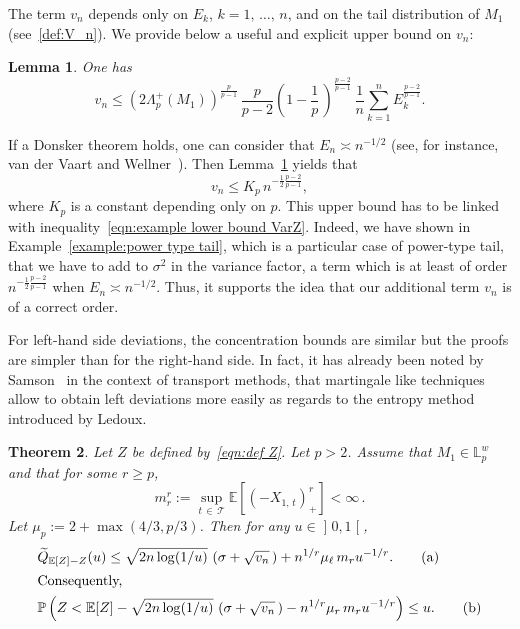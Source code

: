 \documentclass[10pt]{amsart}
\newtheorem{theo}{Theorem}[section]
\newtheorem{lemm}[theo]{Lemma}\newtheorem{prop}[theo]{Proposition}\newtheorem{coro}[theo]{Corollary}\newtheorem{conj}[theo]{Conjecture}
\theoremstyle{definition}\newtheorem{defi}[theo]{Definition}\newtheorem{rema}[theo]{Remark}\newtheorem{exam}[theo]{Example}\newtheorem{exem}[theo]{Example}\newtheorem{nota}[theo]{Notation}
\newcommand{\bE}{\mathbb{E}}
\newcommand{\bL}{\mathbb{L}}
\newcommand{\bP}{\mathbb{P}}
\newcommand{\cT}{\mathcal{T}}
\newcommand{\intervalleoo}[2]{\mathopen{]} #1\mathclose{}\mathpunct{},#2\mathclose{[}}
\let\oldtilde\tilde
\renewcommand*{\tilde}[1]{\mathchoice{\widetilde{#1}}{\widetilde{#1}}{\oldtilde{#1}}{\oldtilde{#1}}}
\begin{document}
The term $v_n$ depends only on $E_k$, $k=1,\,\ldots,\,n$, and on the tail distribution of $M_1$ (see~\eqref{def:V_n}). We provide below a useful and explicit upper bound on $v_n$:
\begin{lemm}\label{lem:upper bound Vn power type tail}
One has
\[
v_n\leq \left(2\Lambda_p^+(M_1)\right)^{\frac{p}{p-1}}\,\frac{p}{p-2}\left(1-\frac 1p\,\right)^{\frac{p-2}{p-1}}\,\frac 1n \sum_{k=1}^n E_k^{\frac{p-2}{p-1}}.
\]
\end{lemm}

If a Donsker theorem holds, one can consider that $E_n\asymp n^{-1/2}$ (see, for instance, van der Vaart and Wellner~\cite{vdVW96}). Then Lemma~\ref{lem:upper bound Vn power type tail} yields that
\begin{equation}\label{eqn:upper bound equiv Vn power type tail}
v_n\leq K_p\,n^{-\frac 12\frac{p-2}{p-1}},
\end{equation}
where $K_p$ is a constant depending only on $p$. This upper bound has to be linked with inequality~\eqref{eqn:example lower bound VarZ}. Indeed, we have shown in Example~\ref{example:power type tail}, which is a particular case of power-type tail, that we have to add to $\sigma^2$ in the variance factor, a term which is at least of order $n^{-\frac 12\frac{p-2}{p-1}}$ when $E_n\asymp n^{-1/2}$. Thus, it supports the idea that our additional term $v_n$ is of a correct order.

For left-hand side deviations, the concentration bounds are similar but the proofs are simpler than for the right-hand side. In fact, it has already been noted by Samson~\cite{Samson07} in the context of transport methods, that martingale like techniques allow to obtain left deviations more easily as regards to the entropy method introduced by Ledoux.

\begin{theo}\label{thm:FukNagaev from Rio left}
Let $Z$ be defined by~\eqref{eqn:def Z}. Let $p>2$. Assume that $M_1\in\bL_p^w$ and that for some $r\geq p$,
\[
m_r^r:=\sup_{t\,\in\,\cT}\bE\left[(-X_{1,\,t})_+^r\right]<\infty\,.
\]
Let $\mu_p:=2+\max(4/3,p/3)$. Then for any $u\in\intervalleoo 01$,
\begin{align}
&\tilde Q_{\bE[Z]-Z}(u)\leq \sqrt{2n\log(1/u)}\,\left(\sigma+\sqrt{v_n}\,\right)+n^{1/r}\mu_\ell\,m_r u^{-1/r}. \tag{$\rm a$}\label{theo2.5.a}
\\
\intertext{Consequently,}
&\bP\left(Z<\bE[Z]-\sqrt{2n\log(1/u)}\,\left(\sigma+\sqrt{v_n}\,\right)-n^{1/r}\mu_r\,m_r u^{-1/r}\right)\leq u. \tag{$\rm b$}\label{theo2.5.b}
\end{align}
\end{theo}
\end{document}
